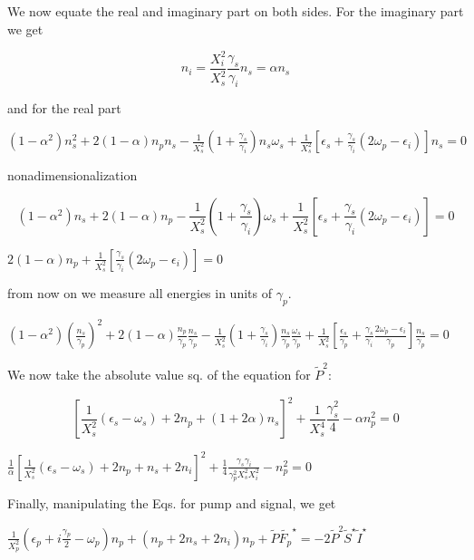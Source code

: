 \documentclass[a4paper,prb,10pt,aps,twocolumn]{revtex4-1}
\begin{document}
We now equate the real and imaginary part on both sides. For the imaginary
part we get

\[
n_{i}=\frac{X_{i}^{2}}{X_{s}^{2}}\frac{\gamma_{s}}{\gamma_{i}}n_{s}=\alpha n_{s}
\]


and for the real part

$\left(1-\alpha^{2}\right)n_{s}^{2}+2\left(1-\alpha\right)n_{p}n_{s}-\frac{1}{X_{s}^{2}}\left(1+\frac{\gamma_{s}}{\gamma_{i}}\right)n_{s}\omega_{s}+\frac{1}{X_{s}^{2}}\left[\epsilon_{s}+\frac{\gamma_{s}}{\gamma_{i}}\left(2\omega_{p}-\epsilon_{i}\right)\right]n_{s}=0$

nonadimensionalization

\[
\left(1-\alpha^{2}\right)n_{s}+2\left(1-\alpha\right)n_{p}-\frac{1}{X_{s}^{2}}\left(1+\frac{\gamma_{s}}{\gamma_{i}}\right)\omega_{s}+\frac{1}{X_{s}^{2}}\left[\epsilon_{s}+\frac{\gamma_{s}}{\gamma_{i}}\left(2\omega_{p}-\epsilon_{i}\right)\right]=0
\]


$2\left(1-\alpha\right)n_{p}+\frac{1}{X_{s}^{2}}\left[\frac{\gamma_{s}}{\gamma_{i}}\left(2\omega_{p}-\epsilon_{i}\right)\right]=0$

from now on we measure all energies in units of $\gamma_{p}$.

$\left(1-\alpha^{2}\right)\left(\frac{n_{s}}{\gamma_{p}}\right)^{2}+2\left(1-\alpha\right)\frac{n_{p}}{\gamma_{p}}\frac{n_{s}}{\gamma_{p}}-\frac{1}{X_{s}^{2}}\left(1+\frac{\gamma_{s}}{\gamma_{i}}\right)\frac{n_{s}}{\gamma_{p}}\frac{\omega_{s}}{\gamma_{p}}+\frac{1}{X_{s}^{2}}\left[\frac{\epsilon_{s}}{\gamma_{p}}+\frac{\gamma_{s}}{\gamma_{i}}\frac{2\omega_{p}-\epsilon_{i}}{\gamma_{p}}\right]\frac{n_{s}}{\gamma_{p}}=0$

We now take the absolute value sq. of the equation for $\tilde{P}^{2}$:

\[
\left[\frac{1}{X_{s}^{2}}\left(\epsilon_{s}-\omega_{s}\right)+2n_{p}+\left(1+2\alpha\right)n_{s}\right]^{2}+\frac{1}{X_{s}^{4}}\frac{\gamma_{s}^{2}}{4}-\alpha n_{p}^{2}=0
\]


$\frac{1}{\alpha}\left[\frac{1}{X_{s}^{2}}\left(\epsilon_{s}-\omega_{s}\right)+2n_{p}+n_{s}+2n_{i}\right]^{2}+\frac{1}{4}\frac{\gamma_{s}\gamma_{i}}{\gamma_{p}^{2}X_{s}^{2}X_{i}^{2}}-n_{p}^{2}=0$

Finally, manipulating the Eqs. for pump and signal, we get

$\frac{1}{X_{p}^{2}}\left(\epsilon_{p}+i\frac{\gamma_{p}}{2}-\omega_{p}\right)n_{p}+\left(n_{p}+2n_{s}+2n_{i}\right)n_{p}+\tilde{P}\tilde{F_{p}}^{\star}=-2\tilde{P}^{2}\tilde{S}^{\star}\tilde{I}^{\star}$
\end{document}
